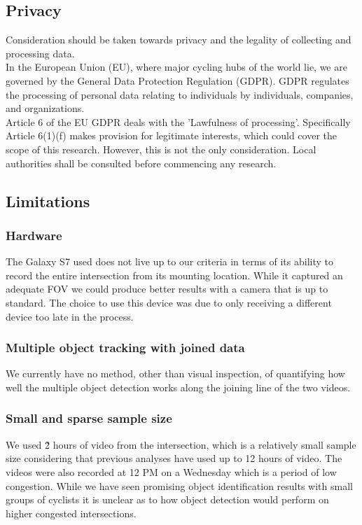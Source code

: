 \subsection{Privacy}

Consideration should be taken towards privacy and the legality of collecting and processing data.
\ \\

In the European Union (EU), where major cycling hubs of the world lie, we are governed by the General Data Protection Regulation (GDPR). GDPR regulates the processing of personal data 
relating to individuals by individuals, companies, and organizations.
\ \\

Article 6 of the EU GDPR deals with the 'Lawfulness of processing'. Specifically Article 6(1)(f)
makes provision for legitimate interests, which could cover the scope of this research.
However, this is not the only consideration. Local authorities shall be consulted before commencing any research.
\ \\

\subsection{Limitations}
\subsubsection{Hardware}
The Galaxy S7 used does not live up to our criteria in terms of its 
ability to record the entire intersection from its mounting location. While it captured an adequate 
FOV we could produce better results with a camera that is up to standard. The choice to use this device 
was due to only receiving a different device too late in the process.
\ \\

\subsubsection{Multiple object tracking with joined data}
We currently have no method, other than visual inspection, of quantifying how well the multiple object 
detection works along the joining line of the two videos.
\ \\

\subsubsection{Small and sparse sample size}
We used \~2 hours of video from the intersection, which is a relatively small sample size considering
that previous analyses have used up to 12 hours of video. The videos were also recorded at 12 PM on a Wednesday 
which is a period of low congestion. While we have seen promising object identification results with small groups
of cyclists it is unclear as to how object detection would perform on higher congested intersections. 
\ \\

